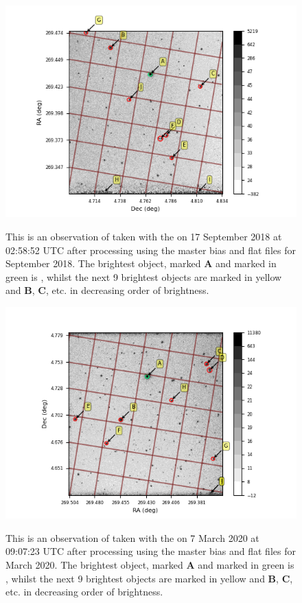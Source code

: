 \begin{figure}[!htbp]
\begin{center}
\includegraphics[scale=1]{images/initgexample.png}
\end{center}   
\caption{This is an observation of {\bstar} taken with the {\gfilter} on
17 September 2018 at 02:58:52 UTC after processing using the master bias and
flat files for September 2018. The brightest object, marked \textbf{A} and marked in
green is \bstar, whilst the next 9 brightest objects are marked in yellow and
\textbf{B}, \textbf{C}, etc. in decreasing order of brightness.}
\protect\label{fig:initgexample}
\end{figure}

\begin{figure}[!htbp]
\begin{center}
\includegraphics[scale=1]{images/initgexample20.png}
\end{center}   
\caption{This is an observation of {\bstar} taken with the {\gfilter} on
7 March 2020 at 09:07:23 UTC after processing using the master bias and
flat files for March 2020. The brightest object, marked \textbf{A} and marked in
green is \bstar, whilst the next 9 brightest objects are marked in yellow and
\textbf{B}, \textbf{C}, etc. in decreasing order of brightness.}
\protect\label{fig:initgexample20}
\end{figure}


